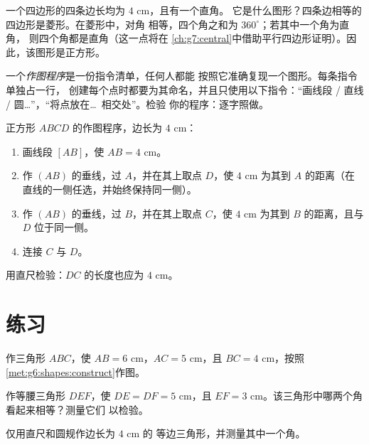 \begin{example}[由性质识别图形]\label{ex:g6:shapes:recognize}
一个四边形的四条边长均为 $4$ cm，且有一个直角。
它是什么图形？四条边相等的四边形是菱形。在菱形中，对角
相等，四个角之和为 $360^\circ$；若其中一个角为直角，
则四个角都是直角（这一点将在
\cref{ch:g7:central}中借助平行四边形证明）。因此，该图形是正方形。
\end{example}

\begin{method}[作图程序]\label{met:g6:shapes:program}
一个\emph{作图程序}是一份指令清单，任何人都能
按照它准确复现一个图形。每条指令单独占一行，
创建每个点时都要为其命名，并且只使用以下指令：“画线段
/ 直线 / 圆\dots”，“将点放在\dots\ 相交处”。检验
你的程序：逐字照做。
\end{method}

\begin{example}\label{ex:g6:shapes:program}
正方形 $ABCD$ 的作图程序，边长为 $4$ cm：
\begin{enumerate}
  \item 画线段 $[AB]$，使 $AB = 4$ cm。
  \item 作 $(AB)$ 的垂线，过 $A$，并在其上取点
        $D$，使 $4$ cm 为其到 $A$ 的距离（在直线的一侧任选，并始终保持同一侧）。
  \item 作 $(AB)$ 的垂线，过 $B$，并在其上取点
        $C$，使 $4$ cm 为其到 $B$ 的距离，且与 $D$ 位于同一侧。
  \item 连接 $C$ 与 $D$。
\end{enumerate}
用直尺检验：$DC$ 的长度也应为 $4$ cm。
\end{example}

\section{练习}

\begin{exercise}[$\star$]\label{exo:g6:shapes:1}
作三角形 $ABC$，使 $AB = 6$ cm，$AC = 5$ cm，且
$BC = 4$ cm，按照\cref{met:g6:shapes:construct}作图。
\end{exercise}

\begin{exercise}[$\star$]\label{exo:g6:shapes:2}
作等腰三角形 $DEF$，使 $DE = DF = 5$ cm，且
$EF = 3$ cm。该三角形中哪两个角看起来相等？测量它们
以检验。
\end{exercise}

\begin{exercise}[$\star$]\label{exo:g6:shapes:3}
仅用直尺和圆规作边长为 $4$ cm 的
等边三角形，并测量其中一个角。
\end{exercise}

